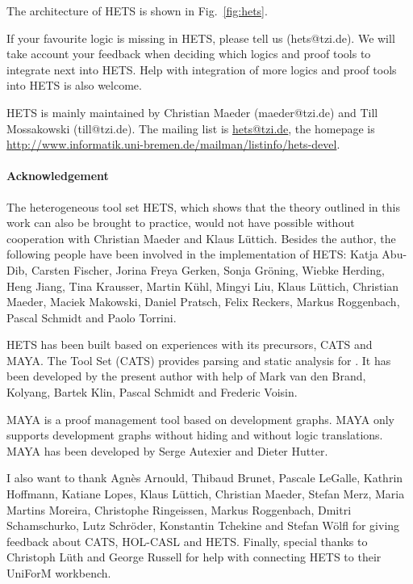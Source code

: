 \documentclass{article}
\newcommand{\normalTEXTSC}[2]{{#1\scriptsize#2}}
\newcommand     {\MAYA}{\normalTEXTSC{M}{AYA}\xspace}
\newcommand     {\Hets}{\normalTEXTSC{H}{ETS}\xspace}
\newcommand     {\Cats}{\normalTEXTSC{C}{ATS}\xspace}
\begin{document}
The architecture of \Hets is shown in Fig.~\ref{fig:hets}. 

If your favourite logic is missing in \Hets, please tell us
(hets@tzi.de). We will take account your feedback when deciding which
logics and proof tools to integrate next into \Hets. Help with
integration of more logics and proof tools into \Hets is also welcome.

\Hets is mainly maintained by
Christian Maeder (maeder@tzi.de) and Till Mossakowski
(till@tzi.de). The mailing list is \url{hets@tzi.de},
the homepage is
\url{http://www.informatik.uni-bremen.de/mailman/listinfo/hets-devel}.

\paragraph{Acknowledgement}
The heterogeneous tool set \Hets, which shows that the theory outlined
in this work can also be brought to practice, would not have possible
without cooperation with Christian Maeder and Klaus L\"uttich.
Besides the author, the following people have been involved
in the implementation of \Hets:
Katja Abu-Dib,
Carsten Fischer,
Jorina Freya Gerken,
Sonja Gr\"{o}ning,
Wiebke Herding,
Heng Jiang,
Tina Krausser,
Martin K\"{u}hl,
Mingyi Liu,
Klaus L\"{u}ttich,
Christian Maeder,
Maciek Makowski,
Daniel Pratsch,
Felix Reckers,
Markus Roggenbach, 
Pascal Schmidt and
Paolo Torrini.

\Hets has been built based on experiences with its
precursors, 
                \index{Cats@\Cats}%
\Cats and 
                \index{Maya@\MAYA}%
\MAYA.
The \CASL Tool Set (\Cats) 
\cite{Mossakowski:2000:CST,Mossakowski:1998:SSA}
provides parsing and static analysis for \CASL.
It has been developed by the present author with help
of Mark van den Brand, Kolyang, Bartek Klin, Pascal Schmidt and 
Frederic Voisin.

\MAYA \cite{Autexier:2002:IHD,AutexierEtal02} is a proof management
tool based on development graphs.  \MAYA only supports development
graphs without hiding and without logic translations.  \MAYA has been
developed by Serge Autexier and Dieter Hutter.

I also want to thank Agn\`es Arnould, Thibaud Brunet, Pascale LeGalle,
Kathrin Hoffmann, Katiane Lopes, Klaus L\"uttich, Christian Maeder,
Stefan Merz, Maria Martins Moreira, Christophe 
Ringeissen, Markus Roggenbach, Dmitri Schamschurko, Lutz Schr\"oder,
Konstantin Tchekine and Stefan W\"olfl 
for giving feedback about \Cats, HOL-CASL and \Hets. Finally,
special thanks to Christoph L\"uth and George Russell
for help with connecting \Hets to their UniForM workbench.




\end{document}
